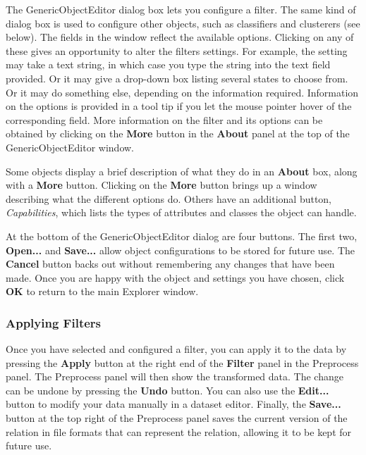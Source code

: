 \documentclass[a4paper]{article}
\begin{document}
The GenericObjectEditor dialog box lets you configure a filter. The
same kind of dialog box is used to configure other objects, such as
classifiers and clusterers (see below). The fields in the window
reflect the available options.  Clicking on any of these gives an
opportunity to alter the filters settings. For example, the setting
may take a text string, in which case you type the string into the
text field provided.  Or it may give a drop-down box listing several
states to choose from.  Or it may do something else, depending on the
information required. Information on the options is provided in a tool
tip if you let the mouse pointer hover of the corresponding
field. More information on the filter and its options can be obtained
by clicking on the \textbf{More} button in the \textbf{About} panel at
the top of the GenericObjectEditor window.

Some objects display a brief description of what they do in an \textbf{About}
box, along with a \textbf{More} button. Clicking on the \textbf{More} button
brings up a window describing what the different options do. Others have an 
additional button, \textit{Capabilities}, which lists the types of
attributes and classes the object can handle. 

At the bottom of the GenericObjectEditor dialog are four buttons. The first
two, \textbf{Open...} and \textbf{Save...} allow object configurations to be
stored for future use. The \textbf{Cancel} button backs out without remembering
any changes that have been made.  Once you are happy with the object and
settings you have chosen, click \textbf{OK} to return to the main Explorer
window.

\subsubsection*{Applying Filters}

Once you have selected and configured a filter, you can apply it to
the data by pressing the \textbf{Apply} button at the right end of the
\textbf{Filter} panel in the Preprocess panel. The Preprocess panel
will then show the transformed data. The change can be undone by
pressing the \textbf{Undo} button. You can also use the
\textbf{Edit...} button to modify your data manually in a dataset
editor.  Finally, the \textbf{Save...}  button at the top right of the
Preprocess panel saves the current version of the relation in file
formats that can represent the relation, allowing it to be kept for future
use.  \\
\end{document}
